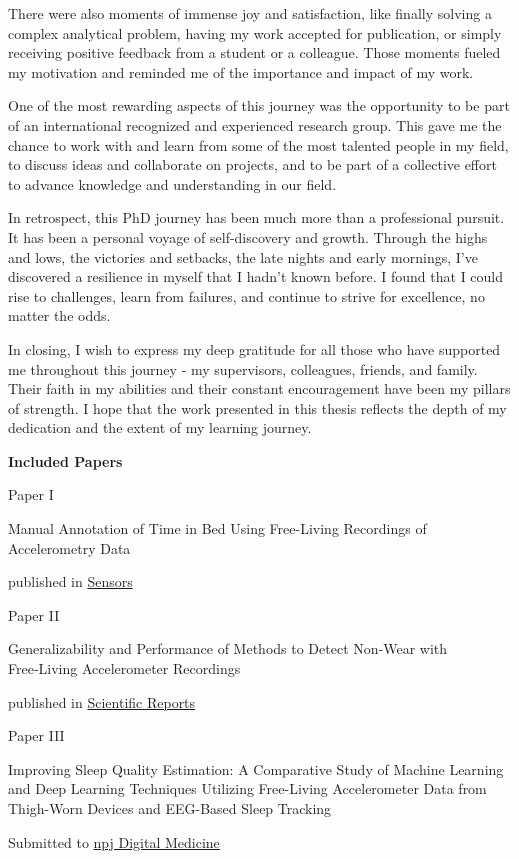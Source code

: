 \documentclass[
  9pt,
]{article}
\begin{document}
There were also moments of immense joy and satisfaction, like finally solving a complex analytical problem, having my work accepted for publication, or simply receiving positive feedback from a student or a colleague. Those moments fueled my motivation and reminded me of the importance and impact of my work.

One of the most rewarding aspects of this journey was the opportunity to be part of an international recognized and experienced research group. This gave me the chance to work with and learn from some of the most talented people in my field, to discuss ideas and collaborate on projects, and to be part of a collective effort to advance knowledge and understanding in our field.

In retrospect, this PhD journey has been much more than a professional pursuit. It has been a personal voyage of self-discovery and growth. Through the highs and lows, the victories and setbacks, the late nights and early mornings, I've discovered a resilience in myself that I hadn't known before. I found that I could rise to challenges, learn from failures, and continue to strive for excellence, no matter the odds.

In closing, I wish to express my deep gratitude for all those who have supported me throughout this journey - my supervisors, colleagues, friends, and family. Their faith in my abilities and their constant encouragement have been my pillars of strength. I hope that the work presented in this thesis reflects the depth of my dedication and the extent of my learning journey.

\newpage

\textsf{\textbf{\Large{Included Papers}}}

\vspace{2cm}

\begin{center}

Paper I

\textsf{Manual Annotation of Time in Bed Using Free-Living Recordings of Accelerometry Data}

published in \href{https://doi.org/10.3390/s21248442}{Sensors}

\vspace{2cm}
Paper II

\textsf{Generalizability and Performance of Methods to Detect Non‑Wear with Free‑Living Accelerometer Recordings}

published in \href{https://doi.org/10.1038/s41598-023-29666-x}{Scientific Reports}

\vspace{2cm}
Paper III 

\textsf{Improving Sleep Quality Estimation: A Comparative Study of Machine Learning and Deep Learning Techniques Utilizing Free-Living Accelerometer Data from Thigh-Worn Devices and EEG-Based Sleep Tracking}

Submitted to \href{https://www.nature.com/npjdigitalmed/}{npj Digital Medicine}

\end{center}
\end{document}
